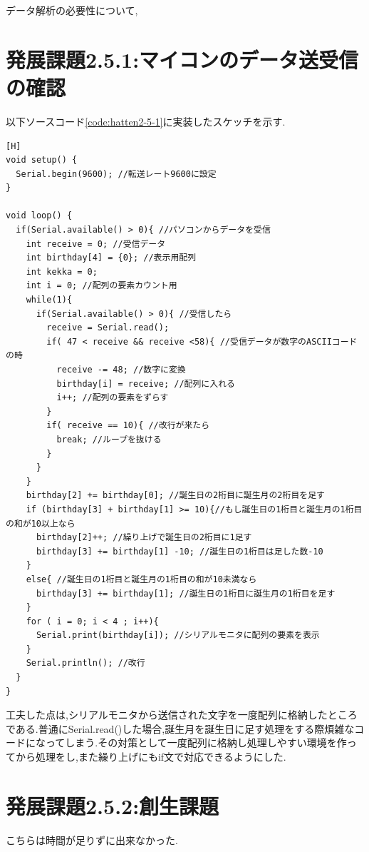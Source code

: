 \documentclass{jarticle}
\begin{document}
データ解析の必要性について,

\section{発展課題2.5.1:マイコンのデータ送受信の確認}
以下ソースコード\ref{code:hatten2-5-1}に実装したスケッチを示す.

\begin{lstlisting}[caption = 発展課題2.5.1,label=code:hatten2-5-1][H]
void setup() {
  Serial.begin(9600); //転送レート9600に設定
}

void loop() {
  if(Serial.available() > 0){ //パソコンからデータを受信
    int receive = 0; //受信データ
    int birthday[4] = {0}; //表示用配列
    int kekka = 0;
    int i = 0; //配列の要素カウント用
    while(1){
      if(Serial.available() > 0){ //受信したら
        receive = Serial.read();
        if( 47 < receive && receive <58){ //受信データが数字のASCIIコードの時
          receive -= 48; //数字に変換
          birthday[i] = receive; //配列に入れる
          i++; //配列の要素をずらす
        }
        if( receive == 10){ //改行が来たら
          break; //ループを抜ける
        }
      }
    }
    birthday[2] += birthday[0]; //誕生日の2桁目に誕生月の2桁目を足す
    if (birthday[3] + birthday[1] >= 10){//もし誕生日の1桁目と誕生月の1桁目の和が10以上なら
      birthday[2]++; //繰り上げで誕生日の2桁目に1足す
      birthday[3] += birthday[1] -10; //誕生日の1桁目は足した数-10
    }
    else{ //誕生日の1桁目と誕生月の1桁目の和が10未満なら
      birthday[3] += birthday[1]; //誕生日の1桁目に誕生月の1桁目を足す
    }
    for ( i = 0; i < 4 ; i++){
      Serial.print(birthday[i]); //シリアルモニタに配列の要素を表示
    }
    Serial.println(); //改行
  }
}
\end{lstlisting}
工夫した点は,シリアルモニタから送信された文字を一度配列に格納したところである.普通にSerial.read()した場合,誕生月を誕生日に足す処理をする際煩雑なコードになってしまう.その対策として一度配列に格納し処理しやすい環境を作ってから処理をし,また繰り上げにもif文で対応できるようにした.

\section{発展課題2.5.2:創生課題}

こちらは時間が足りずに出来なかった.
\end{document}
